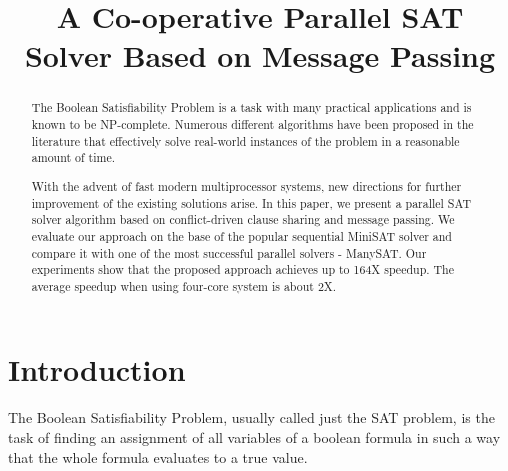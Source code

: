 \documentclass[letterpaper, compsoc, conference]{IEEEtran}
\begin{document}
\title{A Co-operative Parallel SAT Solver Based on Message Passing}

\author{
    \and {}
}
\maketitle
\pagestyle{plain}
\setcounter{page}{1}

\begin{abstract}
The Boolean Satisfiability Problem is a task with many practical applications
and is known to be NP-complete. Numerous different algorithms have been
proposed in the literature that effectively solve real-world instances of the
problem in a reasonable amount of time. 

With the advent of fast modern multiprocessor systems, new directions for
further improvement of the existing solutions arise. In this paper, we present a
parallel SAT solver algorithm based on conflict-driven clause sharing and
message passing. We evaluate our approach on the base of the popular sequential
MiniSAT solver and compare it with one of the most successful parallel solvers
- ManySAT. Our experiments show that the proposed approach achieves up to 164X
speedup. The average speedup when using four-core system is about 2X.

\end{abstract}

\section{Introduction}
The Boolean Satisfiability Problem, usually called just the SAT problem, 
is the task of finding an assignment of all variables of a boolean 
formula in such a way that the whole formula evaluates to a true value.
\end{document}

